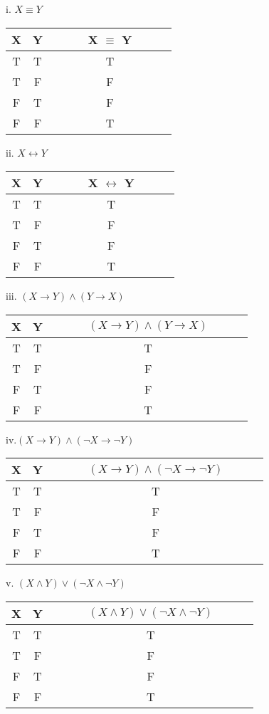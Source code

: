 \documentclass[10pt]{article}
\begin{document}
i. $X \equiv Y$
\center
\begin{tabular}{@{ }c@{ }@{ }c | c@{ }@{ }c@{ }@{ }c@{ }@{ }c@{ }@{ }c@{ }@{ }c@{ }@{ }c}
X & Y &  &  & & X $\equiv$ Y &  & \\
\hline 
T & T &  &  &  & T\\
T & F &  &  &  & F\\
F & T &  &  &  & F\\
F & F &  &  &  & T\\
\end{tabular}
\flushleft

ii. $X \leftrightarrow Y$
\center
\begin{tabular}{@{ }c@{ }@{ }c | c@{ }@{ }c@{ }@{ }c@{ }@{ }c@{ }@{ }c@{ }@{ }c@{ }@{ }c}
X & Y &  &  & & X $\leftrightarrow$ Y &  & \\
\hline 
T & T &  &  &  & T\\
T & F &  &  &  & F\\
F & T &  &  &  & F\\
F & F &  &  &  & T\\
\end{tabular}
\flushleft

iii. $(X \rightarrow Y) \wedge (Y \rightarrow X)$
\center
\begin{tabular}{@{ }c@{ }@{ }c | c@{ }@{ }c@{ }@{ }c@{ }@{ }c@{ }@{ }c@{ }@{ }c@{ }@{ }c}
X & Y &  &  & & $(X \rightarrow Y) \wedge (Y \rightarrow X)$ &  & \\
\hline 
T & T &  &  &  & T\\
T & F &  &  &  & F\\
F & T &  &  &  & F\\
F & F &  &  &  & T\\
\end{tabular}
\flushleft

iv.$(X \rightarrow Y) \wedge (\neg X \rightarrow \neg Y)$
\center
\begin{tabular}{@{ }c@{ }@{ }c | c@{ }@{ }c@{ }@{ }c@{ }@{ }c@{ }@{ }c@{ }@{ }c@{ }@{ }c}
X & Y &  &  & & $(X \rightarrow Y) \wedge (\neg X \rightarrow \neg Y)$ &  & \\
\hline 
T & T &  &  &  & T\\
T & F &  &  &  & F\\
F & T &  &  &  & F\\
F & F &  &  &  & T\\
\end{tabular}
\flushleft

v. $(X \wedge Y) \vee (\neg X \wedge \neg Y)$
\center
\begin{tabular}{@{ }c@{ }@{ }c | c@{ }@{ }c@{ }@{ }c@{ }@{ }c@{ }@{ }c@{ }@{ }c@{ }@{ }c}
X & Y &  &  & & $(X \wedge Y) \vee (\neg X \wedge \neg Y)$ &  & \\
\hline 
T & T &  &  &  & T\\
T & F &  &  &  & F\\
F & T &  &  &  & F\\
F & F &  &  &  & T\\
\end{tabular}
\flushleft
\end{document}
